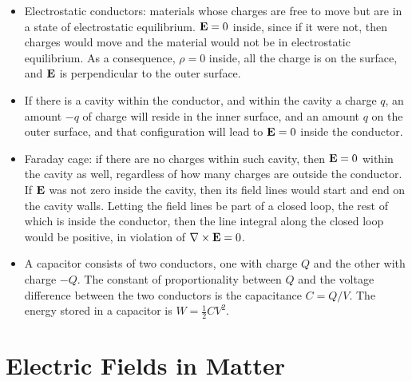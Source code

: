 \documentclass[oneside,a4paper,11pt]{report}
\begin{document}
\begin{itemize}
\item Electrostatic conductors: materials whose charges are free to move but are in a state of electrostatic equilibrium. $\mathbf{E} = 0$ inside, since if it were not, then charges would move and the material would not be in electrostatic equilibrium. As a consequence, $\rho = 0$ inside, all the charge is on the surface, and $\mathbf{E}$ is perpendicular to the outer surface.

\item If there is a cavity within the conductor, and within the cavity a charge $q$, an amount $-q$ of charge will reside in the inner surface, and an amount $q$ on the outer surface, and that configuration will lead to $\mathbf{E} = 0$ inside the conductor.

\item Faraday cage: if there are no charges within such cavity, then $\mathbf{E} = 0$ within the cavity as well, regardless of how many charges are outside the conductor. If $\mathbf{E}$ was not zero inside the cavity, then its field lines would start and end on the cavity walls. Letting the field lines be part of a closed loop, the rest of which is inside the conductor, then the line integral along the closed loop would be positive, in violation of $\nabla \times \mathbf{E} = 0$.

\item A capacitor consists of two conductors, one with charge $Q$ and the other with charge $-Q$. The constant of proportionality between $Q$ and the voltage difference between the two conductors is the capacitance $C = Q/V$. The energy stored in a capacitor is $W = \frac{1}{2} CV^2$.

\end{itemize}

\section{Electric Fields in Matter}

\end{document}
